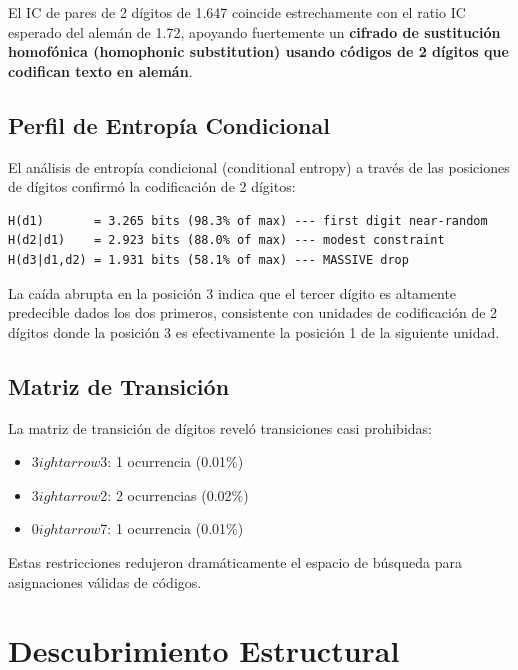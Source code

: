 \documentclass[11pt,a4paper]{article}
\begin{document}
El IC de pares de 2 d\'{i}gitos de 1.647 coincide estrechamente con el ratio IC esperado del alem\'{a}n de 1.72, apoyando fuertemente un \textbf{cifrado de sustituci\'{o}n homof\'{o}nica (homophonic substitution) usando c\'{o}digos de 2 d\'{i}gitos que codifican texto en alem\'{a}n}.

\subsection{Perfil de Entrop\'{i}a Condicional}

El an\'{a}lisis de entrop\'{i}a condicional (conditional entropy) a trav\'{e}s de las posiciones de d\'{i}gitos confirm\'{o} la codificaci\'{o}n de 2 d\'{i}gitos:

\begin{lstlisting}[style=plain]
H(d1)       = 3.265 bits (98.3% of max) --- first digit near-random
H(d2|d1)    = 2.923 bits (88.0% of max) --- modest constraint
H(d3|d1,d2) = 1.931 bits (58.1% of max) --- MASSIVE drop
\end{lstlisting}

La ca\'{i}da abrupta en la posici\'{o}n 3 indica que el tercer d\'{i}gito es altamente predecible dados los dos primeros, consistente con unidades de codificaci\'{o}n de 2 d\'{i}gitos donde la posici\'{o}n 3 es efectivamente la posici\'{o}n 1 de la siguiente unidad.

\subsection{Matriz de Transici\'{o}n}

La matriz de transici\'{o}n de d\'{i}gitos revel\'{o} transiciones casi prohibidas:

\begin{itemize}
\item 3$
ightarrow$3: 1 ocurrencia (0.01\%)
\item 3$
ightarrow$2: 2 ocurrencias (0.02\%)
\item 0$
ightarrow$7: 1 ocurrencia (0.01\%)
\end{itemize}

Estas restricciones redujeron dram\'{a}ticamente el espacio de b\'{u}squeda para asignaciones v\'{a}lidas de c\'{o}digos.

\section{Descubrimiento Estructural}
\end{document}
